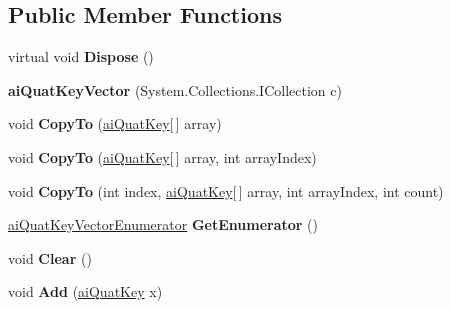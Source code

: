 \subsection*{Public Member Functions}
\begin{DoxyCompactItemize}
\item 
\hypertarget{classai_quat_key_vector_a5b9eca3b5ed953964f931434f0dea210}{virtual void {\bfseries Dispose} ()}\label{classai_quat_key_vector_a5b9eca3b5ed953964f931434f0dea210}

\item 
\hypertarget{classai_quat_key_vector_abec4cb3aefb94770c9318153cf8a1668}{{\bfseries ai\+Quat\+Key\+Vector} (System.\+Collections.\+I\+Collection c)}\label{classai_quat_key_vector_abec4cb3aefb94770c9318153cf8a1668}

\item 
\hypertarget{classai_quat_key_vector_ad20cb3115337ca5668b729509f9fd658}{void {\bfseries Copy\+To} (\hyperlink{structai_quat_key}{ai\+Quat\+Key}\mbox{[}$\,$\mbox{]} array)}\label{classai_quat_key_vector_ad20cb3115337ca5668b729509f9fd658}

\item 
\hypertarget{classai_quat_key_vector_a96d50ae12a370e5cc35ca2dc1ad66393}{void {\bfseries Copy\+To} (\hyperlink{structai_quat_key}{ai\+Quat\+Key}\mbox{[}$\,$\mbox{]} array, int array\+Index)}\label{classai_quat_key_vector_a96d50ae12a370e5cc35ca2dc1ad66393}

\item 
\hypertarget{classai_quat_key_vector_a4d92b9aa9775007949d9dd5e29801e55}{void {\bfseries Copy\+To} (int index, \hyperlink{structai_quat_key}{ai\+Quat\+Key}\mbox{[}$\,$\mbox{]} array, int array\+Index, int count)}\label{classai_quat_key_vector_a4d92b9aa9775007949d9dd5e29801e55}

\item 
\hypertarget{classai_quat_key_vector_a4bba89ca3a6a103ee60a1f212f8c9adc}{\hyperlink{classai_quat_key_vector_1_1ai_quat_key_vector_enumerator}{ai\+Quat\+Key\+Vector\+Enumerator} {\bfseries Get\+Enumerator} ()}\label{classai_quat_key_vector_a4bba89ca3a6a103ee60a1f212f8c9adc}

\item 
\hypertarget{classai_quat_key_vector_a9efc040d17eb4c9947743c216303eb87}{void {\bfseries Clear} ()}\label{classai_quat_key_vector_a9efc040d17eb4c9947743c216303eb87}

\item 
\hypertarget{classai_quat_key_vector_a4e328be5bb4f441e0556df2b5d1e0130}{void {\bfseries Add} (\hyperlink{structai_quat_key}{ai\+Quat\+Key} x)}\label{classai_quat_key_vector_a4e328be5bb4f441e0556df2b5d1e0130}


\end{DoxyCompactItemize}
